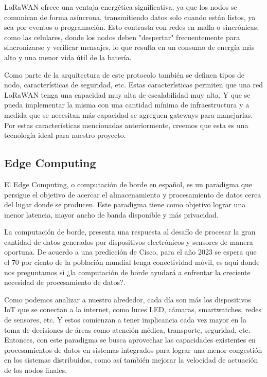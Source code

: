 LoRaWAN ofrece una ventaja energética significativa, ya que los nodos se comunican de forma asíncrona, transmitiendo datos solo cuando están listos, ya sea por eventos o programación. Esto contrasta con redes en malla o sincrónicas, como las celulares, donde los nodos deben "despertar" frecuentemente para sincronizarse y verificar mensajes, lo que resulta en un consumo de energía más alto y una menor vida útil de la batería.

Como parte de la arquitectura de este protocolo también se definen tipos de nodo, características de seguridad, etc. Estas características permiten que una red LoRaWAN tenga una capacidad muy alta de escalabilidad muy alta. Y que se pueda implementar la misma con una cantidad mínima de infraestructura y a medida que se necesitan más capacidad se agreguen gateways para manejarlas. Por estas características mencionadas anteriormente, creemos que esta es una tecnología ideal para nuestro proyecto.

\subsection{Edge Computing}
El Edge Computing, o computación de borde en español, es un paradigma que persigue el objetivo de acercar el almacenamiento y procesamiento de datos cerca del lugar donde se producen. Este paradigma tiene como objetivo lograr una menor latencia, mayor ancho de banda disponible y más privacidad.

La computación de borde, presenta una respuesta al desafío de procesar la gran cantidad de datos generados por dispositivos electrónicos y sensores de manera oportuna. De acuerdo a una predicción de Cisco, para el año 2023 se espera que el 70 por ciento de la población mundial tenga conectividad móvil, es aquí donde nos preguntamos si ¿la computación de borde ayudará a enfrentar la creciente necesidad de procesamiento de datos?.

Como podemos analizar a nuestro alrededor, cada día son más los dispositivos IoT que se conectan a la internet, como luces LED, cámaras, smartwatches, redes de sensores, etc. Y estos comienzan a tener implicancia cada vez mayor en la toma de decisiones de áreas como atención médica, transporte, seguridad, etc. Entonces, con este paradigma se busca aprovechar las capacidades existentes en procesamientos de datos en sistemas integrados para lograr una menor congestión en los sistemas distribuidos, como así también mejorar la velocidad de actuación de los nodos finales.

